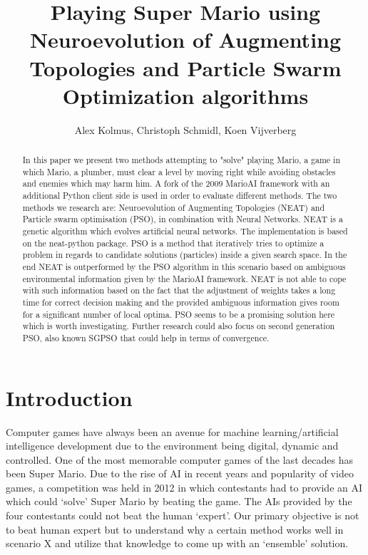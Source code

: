 \documentclass[]{article}
\title{Playing Super Mario using Neuroevolution of Augmenting Topologies and Particle Swarm Optimization algorithms}
\author{Alex Kolmus, Christoph Schmidl, Koen Vijverberg}
\begin{document}
\maketitle
\newpage
\tableofcontents
\newpage

\begin{abstract}
In this paper we present two methods attempting to "solve" playing Mario, a game in which Mario, a plumber, must clear a level by moving right while avoiding obstacles and enemies which may harm him. A fork of the 2009 MarioAI framework with an additional Python client side is used in order to evaluate different methods. The two methods we research are: Neuroevolution of Augmenting Topologies (NEAT) and Particle swarm optimisation (PSO), in combination with Neural Networks. NEAT is a genetic algorithm which evolves artificial neural networks. The implementation is based on the neat-python package. PSO is a method that iteratively tries to optimize a problem in regards to candidate solutions (particles) inside a given search space. In the end NEAT is outperformed by the PSO algorithm in this scenario based on ambiguous environmental information given by the MarioAI framework. NEAT is not able to cope with such information based on the fact that the adjustment of weights takes a long time for correct decision making and the provided ambiguous information gives room for a significant number of local optima. PSO seems to be a promising solution here which is worth investigating. Further research could also focus on second generation PSO, also known SGPSO that could help in terms of convergence.
\end{abstract}

\section{Introduction} \label{introduction}
Computer games have always been an avenue for machine learning/artificial intelligence development due to the environment being digital, dynamic and controlled. One of the most memorable computer games of the last decades has been Super Mario. Due to the rise of AI in recent years and popularity of video games, a competition was held in 2012 in which contestants had to provide an AI which could `solve' Super Mario by beating the game\cite{karakovskiy2012mario}. 
The AIs provided by the four contestants could not beat the human `expert'. Our primary objective is not to beat human expert but to understand why a certain method works well in scenario X and utilize that knowledge to come up with an `ensemble' solution.\\
\end{document}
